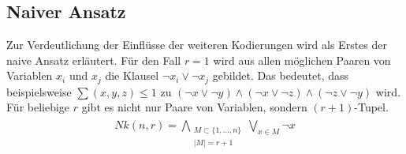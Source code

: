 \documentclass[a4,abstract=on]{scrartcl}
\begin{document}

	\subsection{Naiver Ansatz}
Zur Verdeutlichung der Einflüsse der weiteren Kodierungen wird als Erstes der naive Ansatz \cite[][]{sinz} erläutert. Für den Fall $r=1$ wird aus allen möglichen Paaren von Variablen $x_i$ und $x_j$ die Klausel $\neg x_i \vee \neg x_j$ gebildet. Das bedeutet, dass beispielsweise $\sum(x,y,z)\leq1$ zu $(\neg x \vee \neg y) \wedge (\neg x \vee \neg z) \wedge (\neg z \vee \neg y)$ wird.
Für beliebige $r$ gibt es nicht nur Paare von Variablen, sondern $(r+1)$-Tupel.\\
\begin{align*}
\begin{aligned}
Nk (n, r) = \bigwedge_{\substack{M\subset \{1, \dots, n\} \\  |M|=r+1}} \bigvee_{x \in M} {\neg x}
\end{aligned}
\end{align*}

\end{document}

